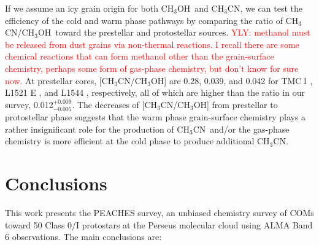 \documentclass[twocolumn]{aastex62}
\newcommand{\methanol}{\mbox{CH$_{3}$OH}}
\newcommand{\methylcyanide}{\mbox{CH$_{3}$CN}}
\begin{document}
If we assume an icy grain origin for both \methanol\ and \methylcyanide, we can test the efficiency of the cold and warm phase pathways by comparing the ratio of \methylcyanide/\methanol\ toward the prestellar and protostellar sources.  \textcolor{red}{YLY: methanol must be released from dust grains via non-thermal reactions.  I recall there are some chemical reactions that can form methanol other than the grain-surface chemistry, perhaps some form of gas-phase chemistry, but don't know for sure now.}  At prestellar cores, [\methylcyanide/\methanol] are 0.28, 0.039, and 0.042 for TMC\,1 \citep{2016ApJS..225...25G}, L1521 E \citep{2019A&A...630A.136N}, and L1544 \citep{2019A&A...630A.136N}, respectively, all of which are higher than the ratio in our survey, 0.012$^{+0.009}_{-0.005}$.  The decreases of [\methylcyanide/\methanol] from prestellar to protostellar phase suggests that the warm phase grain-surface chemistry plays a rather insignificant role for the production of \methylcyanide\ and/or the gas-phase chemistry is more efficient at the cold phase to produce additional \methylcyanide.

\section{Conclusions}
\label{sec:conclusions}
This work presents the PEACHES survey, an unbiased chemistry survey of COMs toward 50 Class 0/I protostars at the Perseus molecular cloud using ALMA Band 6 observations.  The main conclusions are:
\end{document}
